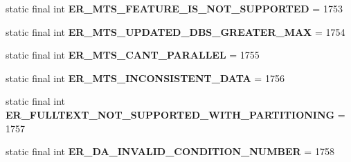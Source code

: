 \begin{DoxyCompactItemize}
\item 
\mbox{\label{classcom_1_1mysql_1_1cj_1_1exceptions_1_1_mysql_error_numbers_a5d68bb353bd4fab13575378b129fd296}} 
static final int {\bfseries E\+R\+\_\+\+M\+T\+S\+\_\+\+F\+E\+A\+T\+U\+R\+E\+\_\+\+I\+S\+\_\+\+N\+O\+T\+\_\+\+S\+U\+P\+P\+O\+R\+T\+ED} = 1753
\item 
\mbox{\label{classcom_1_1mysql_1_1cj_1_1exceptions_1_1_mysql_error_numbers_a8baf422bee2298ccb3d7faa8f403508d}} 
static final int {\bfseries E\+R\+\_\+\+M\+T\+S\+\_\+\+U\+P\+D\+A\+T\+E\+D\+\_\+\+D\+B\+S\+\_\+\+G\+R\+E\+A\+T\+E\+R\+\_\+\+M\+AX} = 1754
\item 
\mbox{\label{classcom_1_1mysql_1_1cj_1_1exceptions_1_1_mysql_error_numbers_ace4ffc84c57ee481a6c0a2617403c811}} 
static final int {\bfseries E\+R\+\_\+\+M\+T\+S\+\_\+\+C\+A\+N\+T\+\_\+\+P\+A\+R\+A\+L\+L\+EL} = 1755
\item 
\mbox{\label{classcom_1_1mysql_1_1cj_1_1exceptions_1_1_mysql_error_numbers_af05a88ef2496b26981187079d2464147}} 
static final int {\bfseries E\+R\+\_\+\+M\+T\+S\+\_\+\+I\+N\+C\+O\+N\+S\+I\+S\+T\+E\+N\+T\+\_\+\+D\+A\+TA} = 1756
\item 
\mbox{\label{classcom_1_1mysql_1_1cj_1_1exceptions_1_1_mysql_error_numbers_ab5eea477287204c9a04ac7b43d8ffead}} 
static final int {\bfseries E\+R\+\_\+\+F\+U\+L\+L\+T\+E\+X\+T\+\_\+\+N\+O\+T\+\_\+\+S\+U\+P\+P\+O\+R\+T\+E\+D\+\_\+\+W\+I\+T\+H\+\_\+\+P\+A\+R\+T\+I\+T\+I\+O\+N\+I\+NG} = 1757
\item 
\mbox{\label{classcom_1_1mysql_1_1cj_1_1exceptions_1_1_mysql_error_numbers_a7f022ade131c44bf6a67bbed72589ee0}} 
static final int {\bfseries E\+R\+\_\+\+D\+A\+\_\+\+I\+N\+V\+A\+L\+I\+D\+\_\+\+C\+O\+N\+D\+I\+T\+I\+O\+N\+\_\+\+N\+U\+M\+B\+ER} = 1758
\item 
\mbox{\label{classcom_1_1mysql_1_1cj_1_1exceptions_1_1_mysql_error_numbers_a5bc28b982a55ea86d68afcfde6bd3dc1}} 

\end{DoxyCompactItemize}
